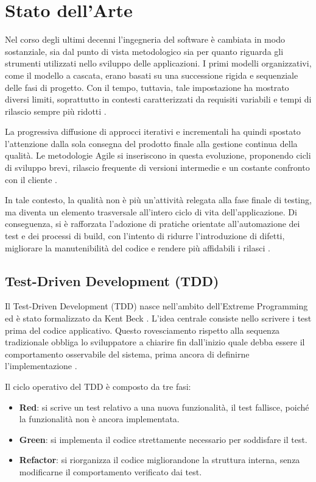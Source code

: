
\chapter{Stato dell'Arte}

Nel corso degli ultimi decenni l’ingegneria del software è cambiata in modo sostanziale, sia dal punto di vista metodologico sia per quanto riguarda gli strumenti utilizzati nello sviluppo delle applicazioni. I primi modelli organizzativi, come il modello a cascata, erano basati su una successione rigida e sequenziale delle fasi di progetto. Con il tempo, tuttavia, tale impostazione ha mostrato diversi limiti, soprattutto in contesti caratterizzati da requisiti variabili e tempi di rilascio sempre più ridotti \cite{Sommerville2016}.

La progressiva diffusione di approcci iterativi e incrementali ha quindi spostato l’attenzione dalla sola consegna del prodotto finale alla gestione continua della qualità. Le metodologie Agile si inseriscono in questa evoluzione, proponendo cicli di sviluppo brevi, rilascio frequente di versioni intermedie e un costante confronto con il cliente \cite{Beck2001}.

In tale contesto, la qualità non è più un'attività relegata alla fase finale di testing, ma diventa un elemento trasversale all’intero ciclo di vita dell’applicazione. Di conseguenza, si è rafforzata l’adozione di pratiche orientate all’automazione dei test e dei processi di build, con l’intento di ridurre l’introduzione di difetti, migliorare la manutenibilità del codice e rendere più affidabili i rilasci \cite{Martin2008}.

\section{Test-Driven Development (TDD)}
Il Test-Driven Development (TDD) nasce nell’ambito dell’Extreme Programming ed è stato formalizzato da Kent Beck \cite{Beck2002}. L’idea centrale consiste nello scrivere i test prima del codice applicativo. Questo rovesciamento rispetto alla sequenza tradizionale obbliga lo sviluppatore a chiarire fin dall’inizio quale debba essere il comportamento osservabile del sistema, prima ancora di definirne l’implementazione \cite{BettiniTDD}.

Il ciclo operativo del TDD è composto da tre fasi:
\begin{itemize}
	\item \textbf{Red}: si scrive un test relativo a una nuova funzionalità, il test fallisce, poiché la funzionalità non è ancora implementata.
	\item \textbf{Green}: si implementa il codice strettamente necessario per soddisfare il test.
	\item \textbf{Refactor}: si riorganizza il codice migliorandone la struttura interna, senza modificarne il comportamento verificato dai test.
\end{itemize}

